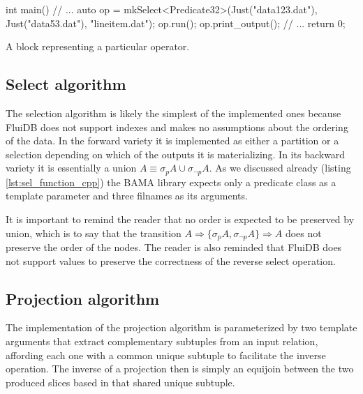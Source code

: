 \begin{code}
\begin{cppcode}
int main() {
  // ...
  {
    auto op = mkSelect<Predicate32>(Just("data123.dat"), Just("data53.dat"),
                                    "lineitem.dat");
    op.run();
    op.print_output();
  }
  // ...
  return 0;
}
\end{cppcode}
  \caption{\label{lst:gen_out_code}A block representing a particular
    operator.}
\end{code}


\subsection{Select algorithm}

The selection algorithm is likely the simplest of the implemented ones
because FluiDB does not support indexes and makes no assumptions about
the ordering of the data. In the forward variety it is implemented as
either a partition or a selection depending on which of the outputs it
is materializing. In its backward variety it is essentially a union
\(A \equiv \sigma_p A \cup \sigma_{\neg p} A\). As we discussed
already (listing \ref{lst:sel_function_cpp}) the BAMA library expects
only a predicate class as a template parameter and three filnames as
its arguments.

It is important to remind the reader that no order is expected to be
preserved by union, which is to say that the transition \(A
\Rightarrow \{\sigma_p A, \sigma_{\neg p} A\} \Rightarrow A\) does not
preserve the order of the nodes. The reader is also reminded that
FluiDB does not support  values to preserve the correctness of
the reverse select operation.


\subsection{Projection algorithm}
\label{sec:projection_algorithm}

The implementation of the projection algorithm is parameterized by two
template arguments that extract complementary subtuples from an input
relation, affording each one with a common unique subtuple to
facilitate the inverse operation. The inverse of a projection then is
simply an equijoin between the two produced slices based in that
shared unique subtuple.

